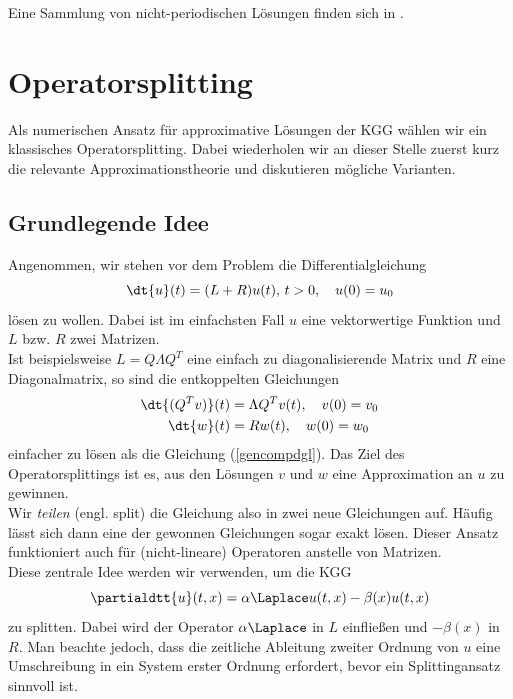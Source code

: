 Eine Sammlung von nicht-periodischen Lösungen finden sich in \autocite{andreipolyanin2004}.

\section{Operatorsplitting}
Als numerischen Ansatz für approximative Lösungen der KGG wählen wir ein klassisches Operatorsplitting. Dabei wiederholen wir an dieser Stelle zuerst kurz die relevante Approximationstheorie und diskutieren mögliche Varianten.
\subsection{Grundlegende Idee}
Angenommen, wir stehen vor dem Problem die Differentialgleichung 
\begin{equation}
\label{gencompdgl}
\dt{u}(t)=(L+R)u(t), \, t>0, \quad u(0)=u_0
\end{equation}
lösen zu wollen. Dabei ist im einfachsten Fall $u$ eine vektorwertige Funktion und $L$ bzw. $R$ zwei Matrizen.\\
Ist beispielsweise $L=Q\Lambda Q^T$ eine einfach zu diagonalisierende Matrix und $R$ eine Diagonalmatrix, so sind die entkoppelten Gleichungen 
\begin{align*}
\dt{(Q^Tv)}(t)&=\Lambda Q^Tv(t), \quad v(0)=v_0\\
\dt{w}(t)&=Rw(t), \quad w(0)=w_0
\end{align*}
einfacher zu lösen als die Gleichung (\ref{gencompdgl}). Das Ziel des Operatorsplittings ist es, aus den Lösungen $v$ und $w$ eine Approximation an $u$ zu gewinnen.\\
Wir \emph{teilen} (engl. split) die Gleichung also in zwei neue Gleichungen auf. Häufig lässt sich dann eine der gewonnen Gleichungen sogar exakt lösen. Dieser Ansatz funktioniert auch für (nicht-lineare) Operatoren anstelle von Matrizen.\\
Diese zentrale Idee werden wir verwenden, um die KGG 
\begin{equation*}
\partialdtt{u}(t,x)=\alpha\Laplace u(t,x)-\beta(x)u(t,x)
\end{equation*}
zu splitten. Dabei wird der Operator $\alpha\Laplace$ in $L$ einfließen und $-\beta(x)$ in $R$. Man beachte jedoch, dass die zeitliche Ableitung zweiter Ordnung von $u$ eine Umschreibung in ein System erster Ordnung erfordert, bevor ein Splittingansatz sinnvoll ist.

